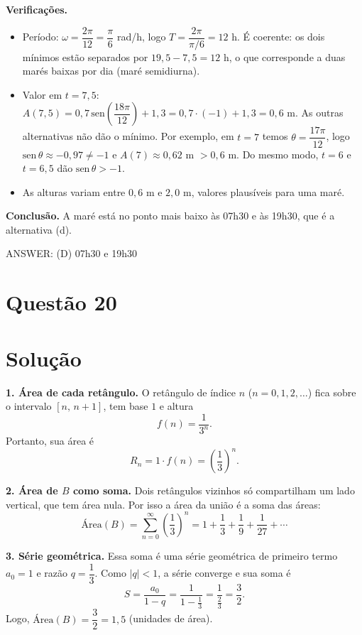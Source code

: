 \documentclass{article}%
\begin{document}
\textbf{Verificações.}
\begin{itemize}
\item Período: $\omega=\dfrac{2\pi}{12}=\dfrac{\pi}{6}$ rad/h, logo $T=\dfrac{2\pi}{\pi/6}=12$ h. É coerente: os dois mínimos estão separados por $19{,}5-7{,}5=12$ h, o que corresponde a duas marés baixas por dia (maré semidiurna).
\item Valor em $t=7{,}5$: $A(7{,}5)=0{,}7\,\mathrm{sen}\!\left(\dfrac{18\pi}{12}\right)+1{,}3=0{,}7\cdot(-1)+1{,}3=0{,}6$ m. As outras alternativas não dão o mínimo. Por exemplo, em $t=7$ temos $\theta=\dfrac{17\pi}{12}$, logo $\mathrm{sen}\,\theta\approx-0{,}97\neq-1$ e $A(7)\approx 0{,}62$ m $>0{,}6$ m. Do mesmo modo, $t=6$ e $t=6{,}5$ dão $\mathrm{sen}\,\theta>-1$.
\item As alturas variam entre $0{,}6$ m e $2{,}0$ m, valores plausíveis para uma maré.
\end{itemize}

\textbf{Conclusão.} A maré está no ponto mais baixo às 07h30 e às 19h30, que é a alternativa (d).

ANSWER: (D) 07h30 e 19h30%
\newpage%
\section*{Questão 20}

\section*{Solução}

\textbf{1. Área de cada retângulo.} O retângulo de índice $n$ ($n=0,1,2,\dots$) fica sobre o intervalo $[n,\,n+1]$, tem base $1$ e altura
\[
f(n)=\frac{1}{3^{n}} .
\]
Portanto, sua área é
\[
R_n = 1\cdot f(n)=\left(\frac{1}{3}\right)^{n}.
\]

\textbf{2. Área de $B$ como soma.} Dois retângulos vizinhos só compartilham um lado vertical, que tem área nula. Por isso a área da união é a soma das áreas:
\[
\text{Área}(B)=\sum_{n=0}^{\infty}\left(\frac{1}{3}\right)^{n}
=1+\frac{1}{3}+\frac{1}{9}+\frac{1}{27}+\cdots
\]

\textbf{3. Série geométrica.} Essa soma é uma série geométrica de primeiro termo $a_0=1$ e razão $q=\dfrac{1}{3}$. Como $|q|<1$, a série converge e sua soma é
\[
S=\frac{a_0}{1-q}=\frac{1}{1-\frac{1}{3}}=\frac{1}{\frac{2}{3}}=\frac{3}{2}.
\]
Logo, $\text{Área}(B)=\dfrac{3}{2}=1{,}5$ (unidades de área).
\end{document}
